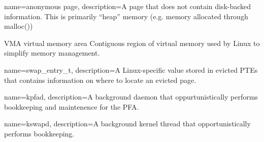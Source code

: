 {
  name={anonymous page},
  description={A page that does not contain disk-backed information. This is
primarily ``heap'' memory (e.g. memory allocated through malloc())}
}

  {VMA}
  {virtual memory area}
  {Contiguous region of virtual memory used by Linux to simplify memory
   management.}

{
  name={swap\_entry\_t},
  description={A Linux-specific value stored in evicted PTEs that contains
information on where to locate an evicted page.}
}

{
  name={kpfad},
  description={A background daemon that oppurtunistically performs bookkeeping
  and maintenence for the PFA.}
}

{
  name={kswapd},
  description={A background kernel thread that opportunistically performs
    bookkeeping.}
}
